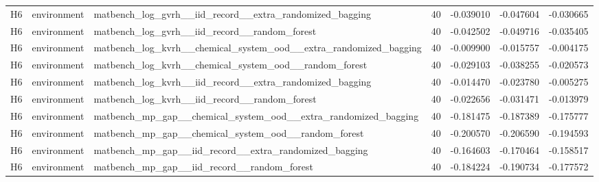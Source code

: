 \documentclass[10pt]{article}
\begin{document}
\begin{landscape}
\begin{longtable}{L{.35in}L{.6in}L{3.55in}L{.4in}L{.88in}L{.88in}L{.88in}}
H6 & environment & matbench\_\allowbreak{}log\_\allowbreak{}gvrh\_\allowbreak{}\_\allowbreak{}iid\_\allowbreak{}record\_\allowbreak{}\_\allowbreak{}extra\_\allowbreak{}randomized\_\allowbreak{}bagging & 40 & -0.039010 & -0.047604 & -0.030665\\
H6 & environment & matbench\_\allowbreak{}log\_\allowbreak{}gvrh\_\allowbreak{}\_\allowbreak{}iid\_\allowbreak{}record\_\allowbreak{}\_\allowbreak{}random\_\allowbreak{}forest & 40 & -0.042502 & -0.049716 & -0.035405\\
H6 & environment & matbench\_\allowbreak{}log\_\allowbreak{}kvrh\_\allowbreak{}\_\allowbreak{}chemical\_\allowbreak{}system\_\allowbreak{}ood\_\allowbreak{}\_\allowbreak{}extra\_\allowbreak{}randomized\_\allowbreak{}bagging & 40 & -0.009900 & -0.015757 & -0.004175\\
H6 & environment & matbench\_\allowbreak{}log\_\allowbreak{}kvrh\_\allowbreak{}\_\allowbreak{}chemical\_\allowbreak{}system\_\allowbreak{}ood\_\allowbreak{}\_\allowbreak{}random\_\allowbreak{}forest & 40 & -0.029103 & -0.038255 & -0.020573\\
H6 & environment & matbench\_\allowbreak{}log\_\allowbreak{}kvrh\_\allowbreak{}\_\allowbreak{}iid\_\allowbreak{}record\_\allowbreak{}\_\allowbreak{}extra\_\allowbreak{}randomized\_\allowbreak{}bagging & 40 & -0.014470 & -0.023780 & -0.005275\\
H6 & environment & matbench\_\allowbreak{}log\_\allowbreak{}kvrh\_\allowbreak{}\_\allowbreak{}iid\_\allowbreak{}record\_\allowbreak{}\_\allowbreak{}random\_\allowbreak{}forest & 40 & -0.022656 & -0.031471 & -0.013979\\
H6 & environment & matbench\_\allowbreak{}mp\_\allowbreak{}gap\_\allowbreak{}\_\allowbreak{}chemical\_\allowbreak{}system\_\allowbreak{}ood\_\allowbreak{}\_\allowbreak{}extra\_\allowbreak{}randomized\_\allowbreak{}bagging & 40 & -0.181475 & -0.187389 & -0.175777\\
H6 & environment & matbench\_\allowbreak{}mp\_\allowbreak{}gap\_\allowbreak{}\_\allowbreak{}chemical\_\allowbreak{}system\_\allowbreak{}ood\_\allowbreak{}\_\allowbreak{}random\_\allowbreak{}forest & 40 & -0.200570 & -0.206590 & -0.194593\\
H6 & environment & matbench\_\allowbreak{}mp\_\allowbreak{}gap\_\allowbreak{}\_\allowbreak{}iid\_\allowbreak{}record\_\allowbreak{}\_\allowbreak{}extra\_\allowbreak{}randomized\_\allowbreak{}bagging & 40 & -0.164603 & -0.170464 & -0.158517\\
H6 & environment & matbench\_\allowbreak{}mp\_\allowbreak{}gap\_\allowbreak{}\_\allowbreak{}iid\_\allowbreak{}record\_\allowbreak{}\_\allowbreak{}random\_\allowbreak{}forest & 40 & -0.184224 & -0.190734 & -0.177572\\

\end{longtable}
\end{landscape}
\end{document}

